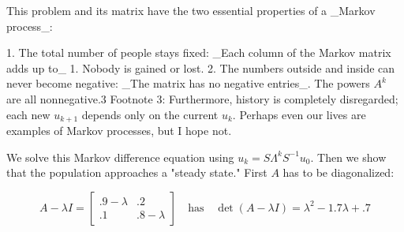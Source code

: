 This problem and its matrix have the two essential properties of a _Markov process_:

1. The total number of people stays fixed: _Each column of the Markov matrix adds up to_ 1. Nobody is gained or lost.
2. The numbers outside and inside can never become negative: _The matrix has no negative entries_. The powers \(A^{k}\) are all nonnegative.3 Footnote 3: Furthermore, history is completely disregarded; each new \(u_{k+1}\) depends only on the current \(u_{k}\). Perhaps even our lives are examples of Markov processes, but I hope not.

We solve this Markov difference equation using \(u_{k}=S\Lambda^{k}S^{-1}u_{0}\). Then we show that the population approaches a "steady state." First \(A\) has to be diagonalized:

\[A-\lambda I=\begin{bmatrix}.9-\lambda&.2\\ .1&.8-\lambda\end{bmatrix}\quad\text{has}\quad\det(A-\lambda I)=\lambda^{2}- 1.7\lambda+.7\] 